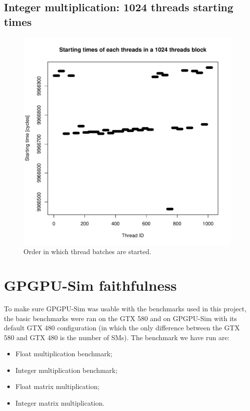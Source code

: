 \documentclass{report}
\def \scalingfactor{.8}
\begin{document}
    \section{Integer multiplication: 1024 threads starting times}
    \begin{figure}[H]
    		\centering
	    	\includegraphics[width=\scalingfactor\linewidth]{"graphics/starting_times_ratio31"}
	    	\vspace{-15pt}
	    	\captionsetup{justification=centering}    
	    	\caption{Order in which thread batches are started.}
    \end{figure}

\chapter{GPGPU-Sim faithfulness}
    To make sure GPGPU-Sim was usable with the benchmarks used in this project, the basic benchmarks were
    ran on the GTX 580 and on GPGPU-Sim with its default GTX 480 configuration (in which the only difference
    between the GTX 580 and GTX 480 is the number of SMs). The benchmark we have run are:
    \begin{itemize}
        \item Float multiplication benchmark;
        \item Integer multiplication benchmark;
        \item Float matrix multiplication; 
        \item Integer matrix multiplication.
    \end{itemize}
\end{document}
